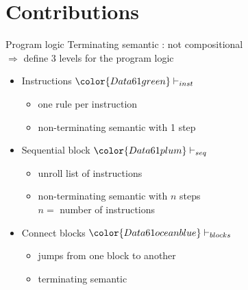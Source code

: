 \documentclass{beamer}
\begin{document}
\part{Contributions}
\frame{\partpage}

\begin{frame}{Program logic}
	Terminating semantic : not compositional\\
	$\Rightarrow$ define 3 levels for the program logic
	\begin{itemize}
		\item<2-> Instructions ${\color{Data61 green}\vdash_{inst}}$
			\begin{itemize}
				\item one rule per instruction
				\item<5-> non-terminating semantic with 1 step
			\end{itemize}
		\item<3-> Sequential block ${\color{Data61 plum}\vdash_{seq}}$
			\begin{itemize}
				\item unroll list of instructions
				\item<5-> non-terminating semantic with $n$ steps \\ $n=$ number of instructions
			\end{itemize}
		\item<4-> Connect blocks ${\color{Data61 ocean blue}\vdash_{blocks}}$
			\begin{itemize}
				\item jumps from one block to another
				\item<6-> terminating semantic
			\end{itemize}
	\end{itemize}
\end{frame}
\end{document}
